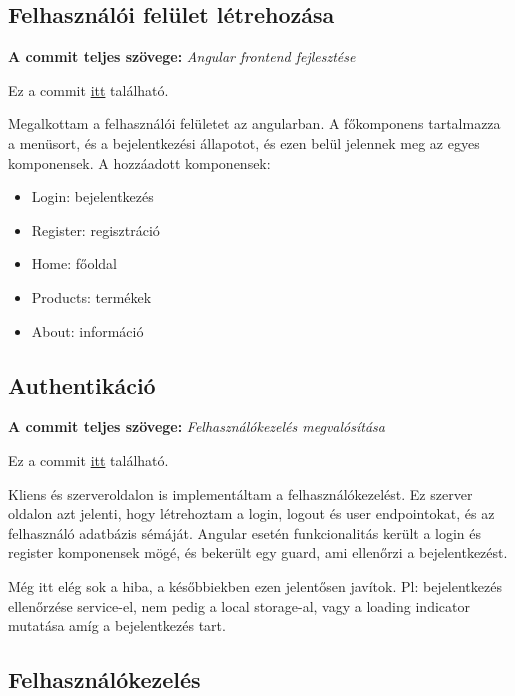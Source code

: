 \documentclass[]{article}
\begin{document}
\subsection{Felhasználói felület létrehozása}

\noindent
\textbf{A commit teljes szövege:} \textit{Angular frontend fejlesztése}

\bigskip
\noindent
Ez a commit \href{https://github.com/Gtomika/prf-project/commit/53e7acb28718a72afb40870192a166d8839e0d08}{itt} található.
\bigskip

Megalkottam a felhasználói felületet az angularban. A főkomponens tartalmazza a menüsort, és a bejelentkezési állapotot, és ezen belül jelennek meg az egyes komponensek. A hozzáadott komponensek:

\begin{itemize}
	\item Login: bejelentkezés
	\item Register: regisztráció
	\item Home: főoldal
	\item Products: termékek
	\item About: információ
\end{itemize}

\subsection{Authentikáció}

\noindent
\textbf{A commit teljes szövege:} \textit{Felhasználókezelés megvalósítása}

\bigskip
\noindent
Ez a commit \href{https://github.com/Gtomika/prf-project/commit/ac23392a3ebe9a36ad80a358ebb768bba0434b408}{itt} található.
\bigskip

Kliens és szerveroldalon is implementáltam a felhasználókezelést. Ez szerver oldalon azt jelenti, hogy létrehoztam a login, logout és user endpointokat, és az felhasználó adatbázis sémáját. Angular esetén funkcionalitás került a login és register komponensek mögé, és bekerült egy guard, ami ellenőrzi a bejelentkezést.

Még itt elég sok a hiba, a későbbiekben ezen jelentősen javítok. Pl: bejelentkezés ellenőrzése service-el, nem pedig a local storage-al, vagy a loading indicator mutatása amíg a bejelentkezés tart.

\subsection{Felhasználókezelés}
\end{document}
